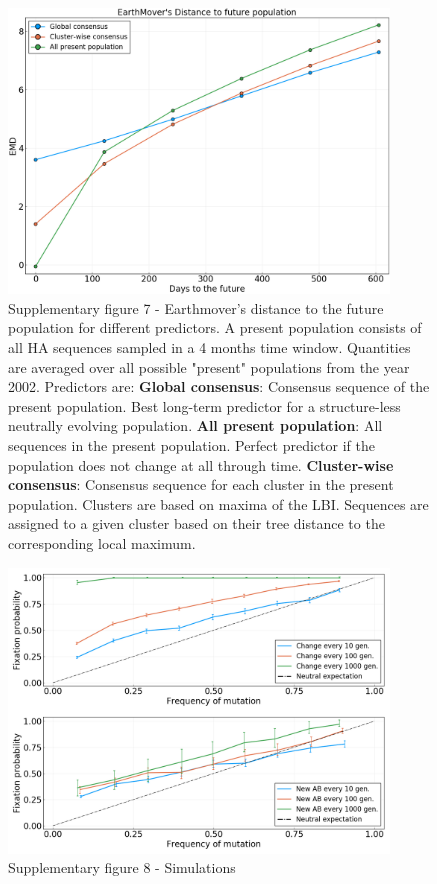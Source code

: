 \documentclass{article}
\begin{document}
	\begin{figure}
		\centering
		\includegraphics[width=0.9\textwidth]{SM_figures/EMD_to_future.png}
		\caption{Supplementary figure 7 - Earthmover's distance to the future population for different predictors. A present population consists of all HA sequences sampled in a 4 months time window. Quantities are averaged over all possible "present" populations from the year 2002. Predictors are: \textbf{Global consensus}: Consensus sequence of the present population. Best long-term predictor for a structure-less neutrally evolving population. \textbf{All present population}: All sequences in the present population. Perfect predictor if the population does not change at all through time. \textbf{Cluster-wise consensus}: Consensus sequence for each cluster in the present population. Clusters are based on maxima of the LBI. Sequences are assigned to a given cluster based on their tree distance to the corresponding local maximum.}
		\label{fig:emd_to_future}
	\end{figure}

	\begin{figure}
		\centering
		\includegraphics[width=0.9\textwidth]{SM_figures/simulation.png}
		\caption{Supplementary figure 8 - Simulations}
		\label{fig:simulations}
	\end{figure}



\end{document}
